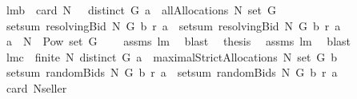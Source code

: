 \begin{isabellebody}
\endisatagproof
{\isafoldproof}%
%
\isadelimproof
%
\endisadelimproof
\isanewline
{}\isamarkupfalse%
\ lm{}{}b{\isacharcolon}\ \ {\isachardoublequoteopen}card\ N\ {\isachargreater}\ {}{\isachardoublequoteclose}\ {\isachardoublequoteopen}distinct\ G{\isachardoublequoteclose}\ {\isachardoublequoteopen}a\ {\isasymin}\ allAllocations\ N\ {\isacharparenleft}set\ G{\isacharparenright}{\isachardoublequoteclose}\ \isanewline
{}\ {\isachardoublequoteopen}setsum\ {\isacharparenleft}resolvingBid{\isacharprime}\ N\ G\ b\ r{\isacharparenright}\ a\ {\isacharequal}\ setsum\ {\isacharparenleft}resolvingBid\ N\ G\ b\ r{\isacharparenright}\ a{\isachardoublequoteclose}\isanewline
%
\isadelimproof
%
\endisadelimproof
%
\isatagproof
{}\isamarkupfalse%
\ {\isacharminus}\isanewline
{}\isamarkupfalse%
\ {\isachardoublequoteopen}a\ {\isasymsubseteq}\ N\ {\isasymtimes}\ {\isacharparenleft}Pow\ {\isacharparenleft}set\ G{\isacharparenright}\ {\isacharminus}\ {\isacharbraceleft}{\isacharbraceleft}{\isacharbraceright}{\isacharbraceright}{\isacharparenright}{\isachardoublequoteclose}\ \isamarkupfalse%
\ assms{\isacharparenleft}{}{\isacharparenright}\ lm{}{}\ \isamarkupfalse%
\ blast\ \isanewline
{}\isamarkupfalse%
\ {\isacharquery}thesis\ \isamarkupfalse%
\ assms{\isacharparenleft}{}{\isacharcomma}{}{\isacharparenright}\ lm{}{}\ \isamarkupfalse%
\ blast\isanewline
{}\isamarkupfalse%
%
\endisatagproof
{\isafoldproof}%
%
\isadelimproof
\isanewline
%
\endisadelimproof
\isanewline
{}\isamarkupfalse%
\ lm{}{}c{\isacharcolon}\ \ {\isachardoublequoteopen}finite\ N{\isachardoublequoteclose}\ {\isachardoublequoteopen}distinct\ G{\isachardoublequoteclose}\ {\isachardoublequoteopen}a\ {\isasymin}\ maximalStrictAllocations{\isacharprime}\ N\ {\isacharparenleft}set\ G{\isacharparenright}\ b{\isachardoublequoteclose}\ \isanewline
{}\ {\isachardoublequoteopen}setsum\ {\isacharparenleft}randomBids{\isacharprime}\ N\ G\ b\ r{\isacharparenright}\ a\ {\isacharequal}\ setsum\ {\isacharparenleft}randomBids\ N\ G\ b\ r{\isacharparenright}\ a{\isachardoublequoteclose}\isanewline
%
\isadelimproof
%
\endisadelimproof
%
\isatagproof
{}\isamarkupfalse%
\ {\isacharminus}\ \isanewline
{}\isamarkupfalse%
\ {\isachardoublequoteopen}card\ {\isacharparenleft}N{\isasymunion}{\isacharbraceleft}seller{\isacharbraceright}{\isacharparenright}{\isachargreater}{}{\isachardoublequoteclose}\ \isamarkupfalse%

\end{isabellebody}
